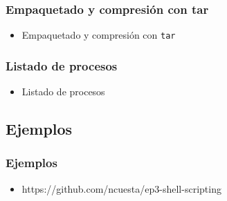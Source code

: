 \begin{frame}
  \frametitle{Empaquetado y compresión con tar}
  \begin{itemize}
    \item Empaquetado y compresión con \texttt{tar}
  \end{itemize}
\end{frame}

\begin{frame}
  \frametitle{Listado de procesos}
  \begin{itemize}
    \item Listado de procesos
  \end{itemize}
\end{frame}

\subsection{Ejemplos}

\begin{frame}
  \frametitle{Ejemplos}
  \begin{itemize}
    \item https://github.com/ncuesta/ep3-shell-scripting
  \end{itemize}
\end{frame}
